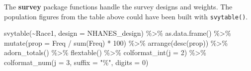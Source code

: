 \documentclass[
]{book}
\newenvironment{Shaded}{\begin{snugshade}}{\end{snugshade}}
\newcommand{\AttributeTok}[1]{\textcolor[rgb]{0.77,0.63,0.00}{#1}}
\newcommand{\DecValTok}[1]{\textcolor[rgb]{0.00,0.00,0.81}{#1}}
\newcommand{\FunctionTok}[1]{\textcolor[rgb]{0.00,0.00,0.00}{#1}}
\newcommand{\NormalTok}[1]{#1}
\newcommand{\SpecialCharTok}[1]{\textcolor[rgb]{0.00,0.00,0.00}{#1}}
\newcommand{\StringTok}[1]{\textcolor[rgb]{0.31,0.60,0.02}{#1}}
\theoremstyle{definition}
\theoremstyle{definition}
\theoremstyle{definition}
\theoremstyle{definition}
\theoremstyle{remark}
\begin{document}
The \textbf{survey} package functions handle the survey designs and weights. The population figures from the table above could have been built with \texttt{svytable()}.

\begin{Shaded}
\begin{Highlighting}[]
\FunctionTok{svytable}\NormalTok{(}\SpecialCharTok{\textasciitilde{}}\NormalTok{Race1, }\AttributeTok{design =}\NormalTok{ NHANES\_design) }\SpecialCharTok{\%\textgreater{}\%}
  \FunctionTok{as.data.frame}\NormalTok{() }\SpecialCharTok{\%\textgreater{}\%}
  \FunctionTok{mutate}\NormalTok{(}\AttributeTok{prop =}\NormalTok{ Freq }\SpecialCharTok{/} \FunctionTok{sum}\NormalTok{(Freq) }\SpecialCharTok{*} \DecValTok{100}\NormalTok{) }\SpecialCharTok{\%\textgreater{}\%}
  \FunctionTok{arrange}\NormalTok{(}\FunctionTok{desc}\NormalTok{(prop)) }\SpecialCharTok{\%\textgreater{}\%}
  \FunctionTok{adorn\_totals}\NormalTok{() }\SpecialCharTok{\%\textgreater{}\%}
  \FunctionTok{flextable}\NormalTok{() }\SpecialCharTok{\%\textgreater{}\%}
  \FunctionTok{colformat\_int}\NormalTok{(}\AttributeTok{j =} \DecValTok{2}\NormalTok{) }\SpecialCharTok{\%\textgreater{}\%}
  \FunctionTok{colformat\_num}\NormalTok{(}\AttributeTok{j =} \DecValTok{3}\NormalTok{, }\AttributeTok{suffix =} \StringTok{"\%"}\NormalTok{, }\AttributeTok{digits =} \DecValTok{0}\NormalTok{)}
\end{Highlighting}
\end{Shaded}

\providecommand{\docline}[3]{\noalign{\global\setlength{\arrayrulewidth}{#1}}\arrayrulecolor[HTML]{#2}\cline{#3}}

\setlength{\tabcolsep}{0pt}

\renewcommand*{\arraystretch}{1.5}
\end{document}
